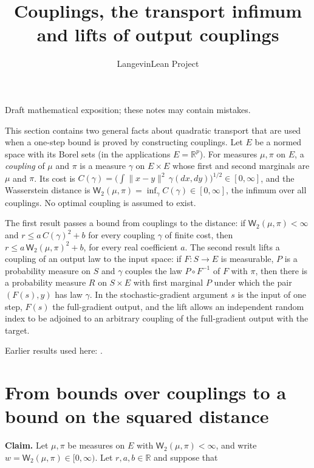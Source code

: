 \documentclass[11pt,a4paper]{article}
\title{\texorpdfstring{Couplings, the transport infimum and lifts of output couplings}{Couplings, the transport infimum and lifts of output couplings}}
\author{LangevinLean Project}
\date{}
\begin{document}
\maketitle
Draft mathematical exposition; these notes may contain mistakes.


This section contains two general facts about quadratic transport that are used when a one-step bound is proved by constructing couplings. Let \(E\) be a normed space with its Borel sets (in the applications \(E=\mathbb R^p\)). For measures \(\mu,\pi\) on \(E\), a \emph{coupling} of \(\mu\) and \(\pi\) is a measure \(\gamma\) on \(E\times E\) whose first and second marginals are \(\mu\) and \(\pi\). Its cost is \(C(\gamma)=\bigl(\int\|x-y\|^2\,\gamma(dx,dy)\bigr)^{1/2}\in[0,\infty]\), and the Wasserstein distance is \(\mathsf W_2(\mu,\pi)=\inf_\gamma C(\gamma)\in[0,\infty]\), the infimum over all couplings. No optimal coupling is assumed to exist.




The first result passes a bound from couplings to the distance: if \(\mathsf W_2(\mu,\pi)<\infty\) and \(r\le a\,C(\gamma)^2+b\) for every coupling \(\gamma\) of finite cost, then \(r\le a\,\mathsf W_2(\mu,\pi)^2+b\), for every real coefficient \(a\). The second result lifts a coupling of an output law to the input space: if \(F:S\to E\) is measurable, \(P\) is a probability measure on \(S\) and \(\gamma\) couples the law \(P\circ F^{-1}\) of \(F\) with \(\pi\), then there is a probability measure \(R\) on \(S\times E\) with first marginal \(P\) under which the pair \((F(s),y)\) has law \(\gamma\). In the stochastic-gradient argument \(s\) is the input of one step, \(F(s)\) the full-gradient output, and the lift allows an independent random index to be adjoined to an arbitrary coupling of the full-gradient output with the target.



Earlier results used here: \cite[Section~3.22]{LangevinLean2026ULASC}.

\section{\texorpdfstring{From bounds over couplings to a bound on the squared distance}{From bounds over couplings to a bound on the squared distance}}


\textbf{Claim.} Let \(\mu,\pi\) be measures on \(E\) with \(\mathsf W_2(\mu,\pi)<\infty\), and write \(w=\mathsf W_2(\mu,\pi)\in[0,\infty)\). Let \(r,a,b\in\mathbb R\) and suppose that
\end{document}
